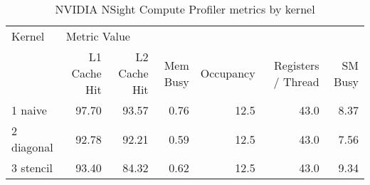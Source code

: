 \begin{table}
\centering
\caption{NVIDIA NSight Compute Profiler metrics by kernel}
\label{prof_table}
\begin{tabular}{lrrrrrr}
\toprule
    Kernel & \multicolumn{6}{l}{Metric Value} \\
           & L1 Cache Hit & L2 Cache Hit & Mem Busy & Occupancy & Registers / Thread & SM Busy \\
\midrule
   1 naive &        97.70 &        93.57 &     0.76 &      12.5 &               43.0 &    8.37 \\
2 diagonal &        92.78 &        92.21 &     0.59 &      12.5 &               43.0 &    7.56 \\
 3 stencil &        93.40 &        84.32 &     0.62 &      12.5 &               43.0 &    9.34 \\
\bottomrule
\end{tabular}
\end{table}
